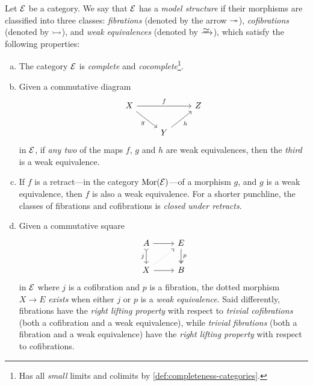 \begin{definition}
    \label{def:model-category}
    Let \(\mathcal E\) be a category. We say that \(\mathcal E\) has a \emph{model
        structure} if their morphisms are classified into three classes:
    \emph{fibrations} (denoted by the arrow \(\twoheadrightarrow\)), \emph{cofibrations} (denoted
    by \(\rightarrowtail\)), and \emph{weak equivalences} (denoted by \(\isoto\)), which
    satisfy the following properties:
    \begin{enumerate}[(a)]\setlength\itemsep{0em}
        \item The category \(\mathcal E\) is \emph{complete} and
              \emph{cocomplete}\footnote{Has all \emph{small} limits and colimits by
                  \cref{def:completeness-categories}.}.

        \item Given a commutative diagram
              \[
                  \begin{tikzcd}
                      X \ar[rr, "f"] \ar[rd, "g"'] & &Z \\
                      &Y \ar[ru, "h"']
                  \end{tikzcd}
              \]
              in \(\mathcal E\), if \emph{any two} of the maps \(f\), \(g\) and \(h\) are weak
              equivalences, then the \emph{third} is a weak equivalence.

        \item If \(f\) is a retract---in the category \(\operatorname{Mor}(\mathcal E)\)---of a morphism
              \(g\), and \(g\) is a weak equivalence, then \(f\) is also a weak
              equivalence. For a shorter punchline, the classes of fibrations and
              cofibrations is \emph{closed under retracts}.

        \item Given a commutative square
              \[
                  \begin{tikzcd}
                      A \ar[r] \ar[d, tail, "j"'] &E \ar[d, two heads, "p"] \\
                      X \ar[ur, dotted] \ar[r] &B
                  \end{tikzcd}
              \]
              in \(\mathcal E\) where \(j\) is a cofibration and \(p\) is a fibration, the
              dotted morphism \(X \to E\) \emph{exists} when either \(j\) or \(p\) is a
              \emph{weak equivalence}. Said differently, fibrations have the \emph{right
                  lifting property} with respect to \emph{trivial cofibrations} (both a
              cofibration and a weak equivalence), while \emph{trivial fibrations} (both a
              fibration and a weak equivalence) have the \emph{right lifting property} with
              respect to cofibrations.


\end{enumerate}
\end{definition}
